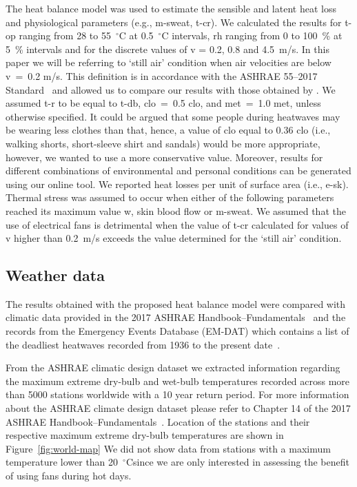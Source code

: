 The heat balance model was used to estimate the sensible and latent heat loss and physiological parameters (e.g., \ac{m-sweat}, \ac{t-cr}).
We calculated the results for \ac{t-op} ranging from 28 to 55~$^{\circ}$C at 0.5~$^{\circ}$C intervals, \ac{rh} ranging from 0 to 100~\% at 5~\% intervals and for the discrete values of \ac{v} = 0.2, 0.8 and 4.5~m/s.
In this paper we will be referring to `still air' condition when air velocities are below \ac{v}~=~0.2 m/s.
This definition is in accordance with the ASHRAE 55--2017 Standard~\cite{ashrae552017} and allowed us to compare our results with those obtained by .
We assumed \ac{t-r} to be equal to \ac{t-db}, \ac{clo}~=~0.5 clo, and \ac{met}~=~1.0 met, unless otherwise specified.
It could be argued that some people during heatwaves may be wearing less clothes than that, hence, a value of \ac{clo} equal to 0.36 clo (i.e., walking shorts, short-sleeve shirt and sandals) would be more appropriate, however, we wanted to use a more conservative value.
Moreover, results for different combinations of environmental and personal conditions can be generated using our online tool.
We reported heat losses per unit of surface area (i.e., \ac{e-sk}).
Thermal stress was assumed to occur when either of the following parameters reached its maximum value \ac{w}, skin blood flow or \ac{m-sweat}.
We assumed that the use of electrical fans is detrimental when the value of \ac{t-cr} calculated for values of \ac{v} higher than 0.2~m/s exceeds the value determined for the `still air' condition.

\subsection{Weather data}\label{subsec:weather-data}

The results obtained with the proposed heat balance model were compared with climatic data provided in the 2017 ASHRAE Handbook--Fundamentals~\cite{ASHRA2017} and the records from the Emergency Events Database (EM-DAT) which contains a list of the deadliest heatwaves recorded from 1936 to the present date~\cite{EMDATThe70:online}.

From the ASHRAE climatic design dataset we extracted information regarding the maximum extreme dry-bulb and wet-bulb temperatures recorded across more than 5000 stations worldwide with a 10 year return period.
For more information about the ASHRAE climate design dataset please refer to Chapter 14 of the 2017 ASHRAE Handbook--Fundamentals~\cite{ASHRA2017}.
Location of the stations and their respective maximum extreme dry-bulb temperatures are shown in Figure~\ref{fig:world-map}
We did not show data from stations with a maximum temperature lower than 20~$^\circ$C\@ since we are only interested in assessing the benefit of using fans during hot days.

